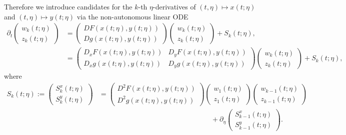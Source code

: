 \documentclass[a4paper]{siamart190516}
\begin{document}
Therefore we introduce candidates for the $k$-th $\eta$-derivatives of $(t,\eta) \mapsto x(t;\eta)$ and $(t,\eta) \mapsto y(t;\eta)$ via the non-autonomous linear ODE
\begin{align*}
\partial_t \begin{pmatrix} w_k(t; \eta) \\ z_k(t; \eta)  \end{pmatrix} &= \begin{pmatrix} DF(x(t;\eta),y(t;\eta))  \\  Dg(x(t;\eta), y(t;\eta))    \end{pmatrix} \begin{pmatrix} w_k(t; \eta) \\ z_k(t; \eta)  \end{pmatrix}  + S_k(t; \eta),  \\
&= \begin{pmatrix} D_xF(x(t;\eta),y(t;\eta))  & D_yF(x(t;\eta),y(t;\eta))  \\  D_x g(x(t;\eta), y(t;\eta)) &  D_y g(x(t;\eta), y(t;\eta))    \end{pmatrix} \begin{pmatrix} w_k(t; \eta) \\ z_k(t; \eta)  \end{pmatrix}  + S_k(t; \eta),
\end{align*}
where
\begin{align*}
S_k(t; \eta) := \begin{pmatrix} S^x_k(t; \eta) \\ S^y_k(t; \eta) \end{pmatrix} &= \begin{pmatrix} D^2 F(x(t;\eta),y(t;\eta))  \\  D^2 g(x(t;\eta), y(t;\eta))   \end{pmatrix} \begin{pmatrix} w_{1}(t; \eta) \\  z_{1}(t;\eta) \end{pmatrix} \begin{pmatrix} w_{k-1}(t; \eta) \\  z_{k-1}(t;\eta) \end{pmatrix} \\
&\qquad \qquad \qquad \qquad \qquad \qquad \qquad \qquad + \partial_{\eta} \begin{pmatrix} S^x_{k-1}(t; \eta) \\ S^y_{k-1}(t; \eta) \end{pmatrix}.
\end{align*}
\end{document}
